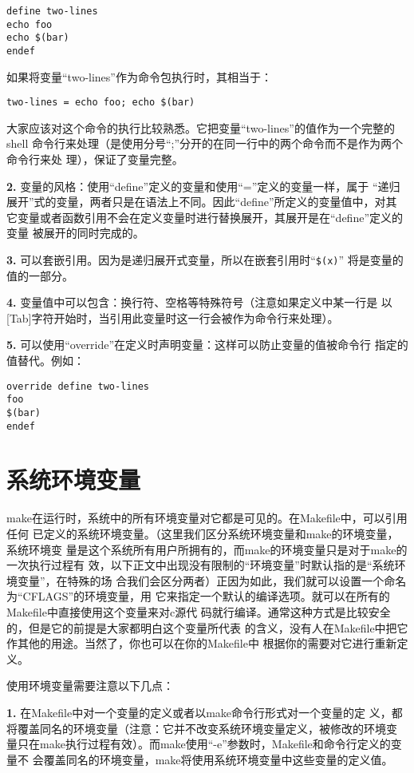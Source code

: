 \begin{Verbatim}[]
define two-lines
echo foo
echo $(bar)
endef
\end{Verbatim}

如果将变量“two-lines”作为命令包执行时，其相当于：
\begin{Verbatim}[]
two-lines = echo foo; echo $(bar)
\end{Verbatim}

大家应该对这个命令的执行比较熟悉。它把变量“two-lines”的值作为一个完整的shell
命令行来处理（是使用分号“;”分开的在同一行中的两个命令而不是作为两个命令行来处
理），保证了变量完整。

\textbf{2.} 变量的风格：使用“define”定义的变量和使用“=”定义的变量一样，属于
“递归展开”式的变量，两者只是在语法上不同。因此“define”所定义的变量值中，对其
它变量或者函数引用不会在定义变量时进行替换展开，其展开是在“define”定义的变量
被展开的同时完成的。

\textbf{3.} 可以套嵌引用。因为是递归展开式变量，所以在嵌套引用时“\verb"$(x)"”
将是变量的值的一部分。

\textbf{4.} 变量值中可以包含：换行符、空格等特殊符号（注意如果定义中某一行是
以[Tab]字符开始时，当引用此变量时这一行会被作为命令行来处理）。

\textbf{5.} 可以使用“override”在定义时声明变量：这样可以防止变量的值被命令行
指定的值替代。例如：
\begin{Verbatim}[]
override define two-lines
foo
$(bar)
endef
\end{Verbatim}

\section{系统环境变量}
make在运行时，系统中的所有环境变量对它都是可见的。在Makefile中，可以引用任何
已定义的系统环境变量。（这里我们区分系统环境变量和make的环境变量，系统环境变
量是这个系统所有用户所拥有的，而make的环境变量只是对于make的一次执行过程有
效，以下正文中出现没有限制的“环境变量”时默认指的是“系统环境变量”，在特殊的场
合我们会区分两者）正因为如此，我们就可以设置一个命名为“CFLAGS”的环境变量，用
它来指定一个默认的编译选项。就可以在所有的Makefile中直接使用这个变量来对c源代
码就行编译。通常这种方式是比较安全的，但是它的前提是大家都明白这个变量所代表
的含义，没有人在Makefile中把它作其他的用途。当然了，你也可以在你的Makefile中
根据你的需要对它进行重新定义。

使用环境变量需要注意以下几点：

\textbf{1.} 在Makefile中对一个变量的定义或者以make命令行形式对一个变量的定
义，都将覆盖同名的环境变量（注意：它并不改变系统环境变量定义，被修改的环境变
量只在make执行过程有效）。而make使用“-e”参数时，Makefile和命令行定义的变量不
会覆盖同名的环境变量，make将使用系统环境变量中这些变量的定义值。



